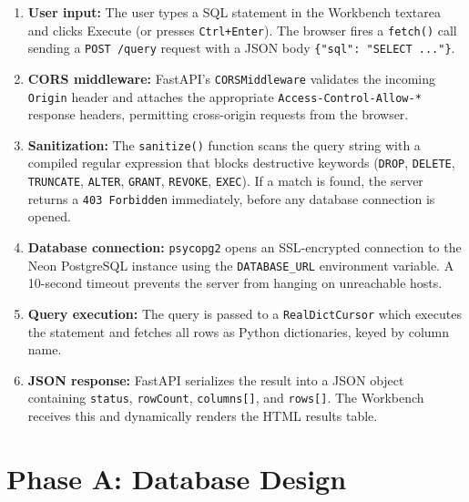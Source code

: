\documentclass[12pt, a4paper]{article}
\begin{document}
\begin{enumerate}[leftmargin=1.5em]
  \item \textbf{User input:} The user types a SQL statement in the Workbench textarea
        and clicks Execute (or presses \texttt{Ctrl+Enter}). The browser fires a
        \texttt{fetch()} call sending a \texttt{POST /query} request with a JSON body
        \texttt{\{"sql": "SELECT ..."\}}.

  \item \textbf{CORS middleware:} FastAPI's \texttt{CORSMiddleware} validates the
        incoming \texttt{Origin} header and attaches the appropriate
        \texttt{Access-Control-Allow-*} response headers, permitting cross-origin
        requests from the browser.

  \item \textbf{Sanitization:} The \texttt{sanitize()} function scans the query string
        with a compiled regular expression that blocks destructive keywords
        (\texttt{DROP}, \texttt{DELETE}, \texttt{TRUNCATE}, \texttt{ALTER},
        \texttt{GRANT}, \texttt{REVOKE}, \texttt{EXEC}). If a match is found, the
        server returns a \texttt{403 Forbidden} immediately, before any database
        connection is opened.

  \item \textbf{Database connection:} \texttt{psycopg2} opens an SSL-encrypted
        connection to the Neon PostgreSQL instance using the \texttt{DATABASE\_URL}
        environment variable. A 10-second timeout prevents the server from hanging
        on unreachable hosts.

  \item \textbf{Query execution:} The query is passed to a \texttt{RealDictCursor}
        which executes the statement and fetches all rows as Python dictionaries,
        keyed by column name.

  \item \textbf{JSON response:} FastAPI serializes the result into a JSON object
        containing \texttt{status}, \texttt{rowCount}, \texttt{columns[]}, and
        \texttt{rows[]}. The Workbench receives this and dynamically renders the
        HTML results table.
\end{enumerate}

\section{Phase A: Database Design}
\end{document}
